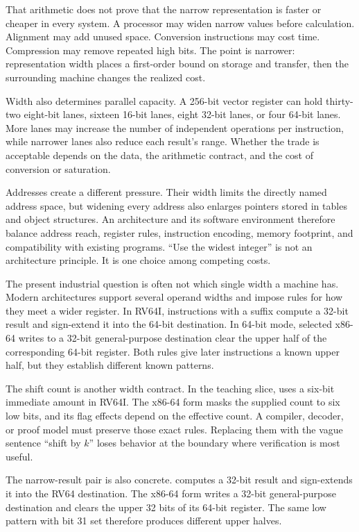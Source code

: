 That arithmetic does not prove that the narrow representation is faster or
cheaper in every system. A processor may widen narrow values before
calculation. Alignment may add unused space. Conversion instructions may cost
time. Compression may remove repeated high bits. The point is narrower:
representation width places a first-order bound on storage and transfer, then
the surrounding machine changes the realized cost.

Width also determines parallel capacity. A 256-bit vector register can hold
thirty-two eight-bit lanes, sixteen 16-bit lanes, eight 32-bit lanes, or four
64-bit lanes. More lanes may increase the number of independent operations per
instruction, while narrower lanes also reduce each result's range. Whether the
trade is acceptable depends on the data, the arithmetic contract, and the
cost of conversion or saturation.

Addresses create a different pressure. Their width limits the directly named
address space, but widening every address also enlarges pointers stored in
tables and object structures. An architecture and its software environment
therefore balance address reach, register rules, instruction encoding,
memory footprint, and compatibility with existing programs. ``Use the widest
integer'' is not an architecture principle. It is one choice among competing
costs.

The present industrial question is often not which single width a machine
has. Modern architectures support several operand widths and impose rules for
how they meet a wider register. In RV64I, instructions with a  suffix
compute a 32-bit result and sign-extend it into the 64-bit destination.
\autocite{riscv2026unpriv} In 64-bit mode, selected x86-64 writes to a 32-bit
general-purpose destination clear the upper half of the corresponding 64-bit
register.\autocite{intel2026sdm1} Both rules give later instructions a known
upper half, but they establish different known patterns.

The shift count is another width contract. In the teaching slice,
 uses a six-bit immediate amount in RV64I. The
x86-64 form  masks the supplied count to six low bits, and
its flag effects depend on the effective count.
\autocite{riscv2026unpriv,intel2026sdm2}
A compiler, decoder, or proof model must preserve those exact rules. Replacing
them with the vague sentence ``shift by \(k\)'' loses behavior at the boundary
where verification is most useful.

The narrow-result pair is also concrete.  computes a
32-bit result and sign-extends it into the RV64 destination. The x86-64 form
 writes a 32-bit general-purpose destination and clears
the upper 32 bits of its 64-bit register. The same low pattern with bit 31 set
therefore produces different upper halves.
\autocite{riscv2026unpriv,intel2026sdm1,intel2026sdm2}

